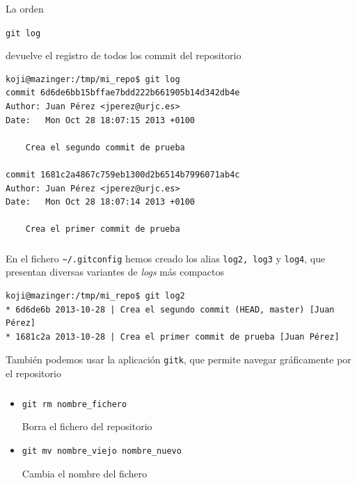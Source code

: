 \documentclass[ucs]{beamer}
\begin{document}
\begin{frame}[fragile]
\frametitle{}
La orden 

\verb|git log|

devuelve el registro de todos los commit del repositorio

  \begin{footnotesize}
  \begin{verbatim}
koji@mazinger:/tmp/mi_repo$ git log
commit 6d6de6bb15bffae7bdd222b661905b14d342db4e
Author: Juan Pérez <jperez@urjc.es>
Date:   Mon Oct 28 18:07:15 2013 +0100

    Crea el segundo commit de prueba

commit 1681c2a4867c759eb1300d2b6514b7996071ab4c
Author: Juan Pérez <jperez@urjc.es>
Date:   Mon Oct 28 18:07:14 2013 +0100

    Crea el primer commit de prueba

  \end{verbatim}
  \end{footnotesize}

\end{frame}



\begin{frame}[fragile]
\frametitle{}
En el fichero \verb|~/.gitconfig| hemos creado los alias
\verb|log2, log3| y \verb|log4|, que presentan
diversas variantes de 
\emph{logs} más compactos

  \begin{scriptsize}
  \begin{verbatim}
koji@mazinger:/tmp/mi_repo$ git log2
* 6d6de6b 2013-10-28 | Crea el segundo commit (HEAD, master) [Juan Pérez]
* 1681c2a 2013-10-28 | Crea el primer commit de prueba [Juan Pérez] 
  \end{verbatim}
  \end{scriptsize}

También podemos usar la aplicación \verb|gitk|, que permite navegar
gráficamente por el repositorio
\end{frame}


\begin{frame}[fragile]
\frametitle{}
\begin{itemize}
\item
\verb|git rm nombre_fichero| 

Borra el fichero del repositorio
\item
\verb|git mv nombre_viejo nombre_nuevo|  

Cambia el nombre del fichero

\end{itemize}

\end{frame}
\end{document}
